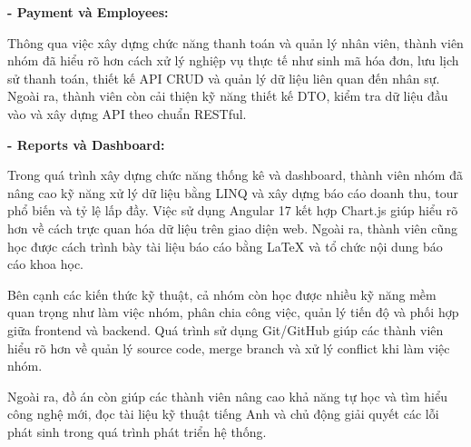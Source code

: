 \vspace{0.5cm}

\noindent\textbf{- Payment và Employees:}

Thông qua việc xây dựng chức năng thanh toán và quản lý nhân viên, thành viên nhóm
đã hiểu rõ hơn cách xử lý nghiệp vụ thực tế như sinh mã hóa đơn, lưu lịch sử thanh toán,
thiết kế API CRUD và quản lý dữ liệu liên quan đến nhân sự. Ngoài ra, thành viên còn cải thiện
kỹ năng thiết kế DTO, kiểm tra dữ liệu đầu vào và xây dựng API theo chuẩn RESTful.

\vspace{0.5cm}

\noindent\textbf{- Reports và Dashboard:}

Trong quá trình xây dựng chức năng thống kê và dashboard, thành viên nhóm đã nâng cao
kỹ năng xử lý dữ liệu bằng LINQ và xây dựng báo cáo doanh thu, tour phổ biến và tỷ lệ lấp đầy.
Việc sử dụng Angular 17 kết hợp Chart.js giúp hiểu rõ hơn về cách trực quan hóa dữ liệu trên giao diện web.
Ngoài ra, thành viên cũng học được cách trình bày tài liệu báo cáo bằng LaTeX và tổ chức nội dung báo cáo khoa học.

\vspace{0.5cm}

Bên cạnh các kiến thức kỹ thuật, cả nhóm còn học được nhiều kỹ năng mềm quan trọng như
làm việc nhóm, phân chia công việc, quản lý tiến độ và phối hợp giữa frontend và backend.
Quá trình sử dụng Git/GitHub giúp các thành viên hiểu rõ hơn về quản lý source code,
merge branch và xử lý conflict khi làm việc nhóm.

Ngoài ra, đồ án còn giúp các thành viên nâng cao khả năng tự học và tìm hiểu công nghệ mới,
đọc tài liệu kỹ thuật tiếng Anh và chủ động giải quyết các lỗi phát sinh trong quá trình phát triển hệ thống.
